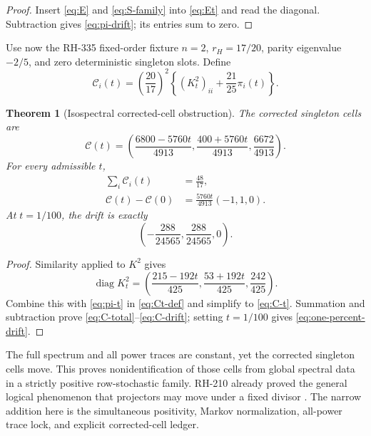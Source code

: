 \documentclass[11pt]{article}
\newtheorem{theorem}{Theorem}[section]
\theoremstyle{remark}
\newcommand{\cC}{\mathcal C}
\begin{document}
\begin{proof}
Insert \eqref{eq:E} and \eqref{eq:S-family} into \eqref{eq:Et} and read the
diagonal.  Subtraction gives \eqref{eq:pi-drift}; its entries sum to zero.
\end{proof}

Use now the RH-335 fixed-order fixture $n=2$, $r_H=17/20$, parity
eigenvalue $-2/5$, and zero deterministic singleton slots.  Define
\begin{equation}\label{eq:Ct-def}
 \cC_i(t)=\left(\frac{20}{17}\right)^2
 \left\{(K_t^2)_{ii}+\frac{21}{25}\pi_i(t)\right\}.
\end{equation}

\begin{theorem}[Isospectral corrected-cell obstruction]
\label{thm:C-drift}
The corrected singleton cells are
\begin{equation}\label{eq:C-t}
 \boxed{
 \cC(t)=\left(
 \frac{6800-5760t}{4913},
 \frac{400+5760t}{4913},
 \frac{6672}{4913}\right).}
\end{equation}
For every admissible $t$,
\begin{align}
 \sum_i\cC_i(t)&=\frac{48}{17},\label{eq:C-total}\\
 \cC(t)-\cC(0)&=\frac{5760t}{4913}(-1,1,0).
 \label{eq:C-drift}
\end{align}
At $t=1/100$, the drift is exactly
\begin{equation}\label{eq:one-percent-drift}
 \left(-\frac{288}{24565},\frac{288}{24565},0\right).
\end{equation}
\end{theorem}

\begin{proof}
Similarity applied to $K^2$ gives
\[
 \operatorname{diag}K_t^2
 =\left(\frac{215-192t}{425},
 \frac{53+192t}{425},\frac{242}{425}\right).
\]
Combine this with \eqref{eq:pi-t} in \eqref{eq:Ct-def} and simplify to
\eqref{eq:C-t}.  Summation and subtraction prove
\eqref{eq:C-total}--\eqref{eq:C-drift}; setting $t=1/100$ gives
\eqref{eq:one-percent-drift}.
\end{proof}

The full spectrum and all power traces are constant, yet the corrected
singleton cells move.  This proves nonidentification of those cells from
global spectral data in a strictly positive row-stochastic family.
RH-210 already proved the general logical phenomenon that projectors may
move under a fixed divisor \citep{WangDivisorPivot2026}.  The narrow addition
here is the simultaneous positivity, Markov normalization, all-power trace
lock, and explicit corrected-cell ledger.
\end{document}
